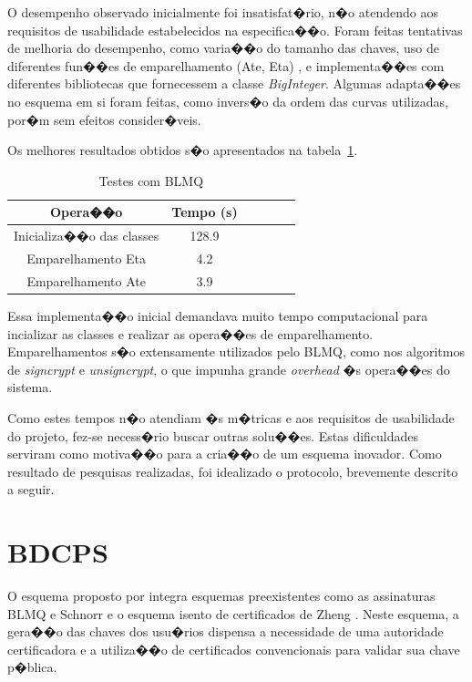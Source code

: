 \documentclass[a4paper,capchap,espacoduplo,normaltoc]{abntepusp}
\begin{document}
O desempenho observado inicialmente foi insatisfat�rio, n�o atendendo aos requisitos de usabilidade estabelecidos na especifica��o. Foram feitas tentativas de melhoria do desempenho, como varia��o do tamanho das chaves, uso de diferentes fun��es de emparelhamento (Ate, Eta) \cite{freeman-scott-teske}, e implementa��es com diferentes bibliotecas que fornecessem a classe \emph{BigInteger}. Algumas adapta��es no esquema em si foram feitas, como invers�o da ordem das curvas utilizadas, por�m sem efeitos consider�veis. 


Os melhores resultados obtidos s�o apresentados na tabela~\ref{tab:BLMQ}.

\begin{table}[h]\centering
\caption{Testes com BLMQ}\label{tab:BLMQ}
\begin{tabular}{cccccc}\hline
Opera��o                   &  Tempo (s)\\\hline
Inicializa��o das classes  &  128.9\\\hline
Emparelhamento Eta         &  4.2\\\hline
Emparelhamento Ate          &  3.9\\\hline
\end{tabular}
\end{table}

Essa implementa��o inicial demandava muito tempo computacional para incializar as classes e realizar as opera��es de emparelhamento. Emparelhamentos s�o extensamente utilizados pelo BLMQ, como nos algoritmos de \emph{signcrypt} e \emph{unsigncrypt}, o que impunha grande \emph{overhead} �s opera��es do sistema. 

Como estes tempos n�o atendiam �s m�tricas e aos requisitos de usabilidade do projeto, fez-se necess�rio buscar outras solu��es. Estas dificuldades serviram como motiva��o para a cria��o de um esquema inovador. Como resultado de pesquisas realizadas, foi idealizado o protocolo, brevemente descrito a seguir.

\section{BDCPS}

O esquema proposto por \cite{bdcps} integra esquemas preexistentes como as assinaturas BLMQ e Schnorr \cite{schnorr} e o esquema isento de certificados de Zheng \cite{zheng}. Neste esquema, a gera��o das chaves dos usu�rios dispensa a necessidade de uma autoridade certificadora e a utiliza��o de certificados convencionais para validar sua chave p�blica. 
\end{document}
